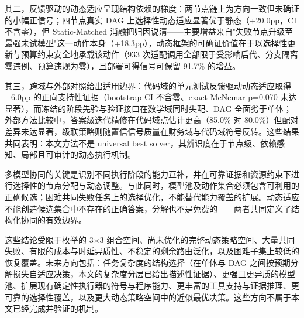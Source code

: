 其二，反馈驱动的动态适应呈现结构依赖的梯度：两节点链上为方向一致但未确证的小幅正信号；四节点真实 DAG 上选择性动态适应显著优于静态（+20.0pp，CI 不含零），但 Static-Matched 消融把归因说清——主要增益来自"失败节点升级至最强未试模型"这一动作本身（+18.3pp），动态框架的可确证价值在于以选择性更新与预算约束安全地承载该动作（933 次适配调用全部限于受影响后代、分支隔离零违例、预算违规为零），且部署可得信号可保留 91.7\% 的增益。

其三，跨域与外部对照给出适用边界：代码域的单元测试反馈驱动动态适应取得 +6.0pp 的正向支持性证据（bootstrap CI 不含零、exact McNemar p=0.070 未达显著），而冻结的阶段先验与验证接口在数学域同时失配、DAG 全面劣于单体；外部方法比较中，答案级迭代精修在代码域点估计更高（85.0\% 对 80.0\%）但配对差异未达显著，级联策略则随置信信号质量在财务域与代码域符号反转。这些结果共同表明：本文方法不是 universal best solver，其辨识度在于节点级、依赖感知、局部且可审计的动态执行机制。

多模型协同的关键是识别不同执行阶段的能力互补，并在可靠证据和资源约束下进行选择性的节点分配与动态调整。与此同时，模型池及动作集合必须包含可利用的正确候选；困难共同失败任务上的选择优化，不能替代能力覆盖的扩展。动态适应不能创造候选集合中不存在的正确答案，分解也不是免费的——两者共同定义了结构化协同的有效边界。

这些结论受限于枚举的 3×3 组合空间、尚未优化的完整动态策略空间、大量共同失败、有限的成本与时延异质性、不稳定的剩余路由泛化，以及困难子集上较低的恢复覆盖。未来方向包括：任务复杂度的结构选择（在单体与 DAG 之间按预期分解损失自适应决策，本文的复杂度分层已给出描述性证据）、更强且更异质的模型池、扩展现有确定性执行器的符号与程序能力、更丰富的工具支持与证据推理、更可靠的选择性覆盖，以及更大动态策略空间中的近似最优决策。这些方向不属于本文已经完成并验证的机制。
